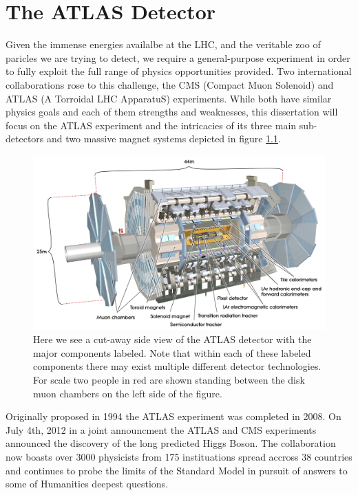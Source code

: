 \chapter{The ATLAS Detector} \label{chap:atlas}

Given the immense energies availalbe at the LHC, and the veritable zoo of
paricles we are trying to detect, we require a general-purpose experiment in
order to fully exploit the full range of physics opportunities provided.  Two
international collaborations rose to this challenge, the CMS (Compact Muon
Solenoid) and ATLAS (A Torroidal LHC ApparatuS) experiments.  While both have
similar physics goals and each of them strengths and weaknesses, this
dissertation will focus on the ATLAS experiment and the intricacies of its three
main sub-detectors and two massive magnet systems depicted in figure
\ref{fig:atlas_cutaway}.

\begin{figure}[!htbp]
  \begin{center}
    \includegraphics[width=0.9\linewidth]{figures/atlas/atlas_cutaway.pdf}
    \caption{ \cite{PERF-2007-01} Here we see a cut-away side view of the ATLAS
detector with the major components labeled.  Note that within each of these
labeled components there may exist multiple different detector technologies.
For scale two people in red are shown standing between the disk muon chambers on the
left side of the figure. }
    \label{fig:atlas_cutaway}
  \end{center}
\end{figure}

Originally proposed in 1994 the ATLAS experiment was completed in 2008. On
July 4th, 2012 in a joint announcment the ATLAS and CMS experiments announced
the discovery of the long predicted Higgs Boson.  The collaboration now boasts
over 3000 physicists from 175 instituations spread accross 38 countries and
continues to probe the limits of the Standard Model in pursuit of answers to
some of Humanities deepest questions.

